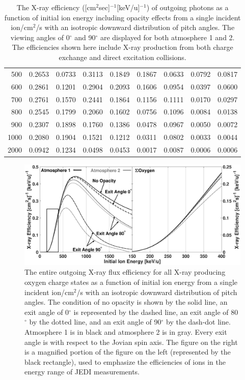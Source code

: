 \documentclass[draft]{agujournal2018}
\begin{document}
\begin{table}
\begin{tabular}{r|c|c|c|c|c|c|c|c}
    500      & 0.2653 & 0.0733 & 0.3113	& 0.1849 & 0.1867 & 0.0633 & 0.0792 & 0.0817 \\
    600      & 0.2861 & 0.1201 & 0.2904	& 0.2093 & 0.1606 & 0.0954 & 0.0397 & 0.0600 \\
    700      & 0.2761 & 0.1570 & 0.2441	& 0.1864 & 0.1156 & 0.1111 & 0.0170 & 0.0297 \\
    800      & 0.2545 & 0.1799 & 0.2060	& 0.1602 & 0.0756 & 0.1096 & 0.0084 & 0.0138 \\
    900      & 0.2307 & 0.1898 & 0.1760	& 0.1386 & 0.0478 & 0.0967 & 0.0050 & 0.0072 \\
    1000     & 0.2080 & 0.1904 & 0.1521	& 0.1212 & 0.0311 & 0.0802 & 0.0033 & 0.0044 \\
    2000     & 0.0942 & 0.1234 & 0.0498	& 0.0453 & 0.0017 & 0.0087 & 0.0006 & 0.0006 \\
    \hline
    \end{tabular}
    \caption{The X-ray efficiency ([cm$^2$sec]$^{-1}$[keV/u]$^{-1}$) of outgoing photons as a function of initial ion energy including opacity effects from a single incident ion/cm$^2$/s with an isotropic downward distribution of pitch angles. The viewing angles of 0$^\circ$ and 90$^\circ$ are displayed for both atmosphere 1 and 2. The efficiencies shown here include X-ray production from both charge exchange and direct excitation collisions.}
    \label{tab:XrayEff}
\end{table}

\begin{figure}
    \centering
    \includegraphics[width=\textwidth]{Figures/OxyXrayEff2.eps}
    \caption{The entire outgoing X-ray flux efficiency for all X-ray producing oxygen charge states as a function of initial ion energy from a single incident ion/cm$^2$/s with an isotropic downward distribution of pitch angles. The condition of no opacity is shown by the solid line, an exit angle of 0$^{\circ}$ is represented by the dashed line, an exit angle of 80$^{\circ}$ by the dotted line, and an exit angle of 90$^{\circ}$ by the dash-dot line. Atmosphere 1 is in black and atmosphere 2 is in gray. Every exit angle is with respect to the Jovian spin axis. The figure on the right is a magnified portion of the figure on the left (represented by the black rectangle), used to emphasize the efficiencies of ions in the energy range of JEDI measurements.}
    \label{fig:OxyXrayEff}
\end{figure}
\end{document}
